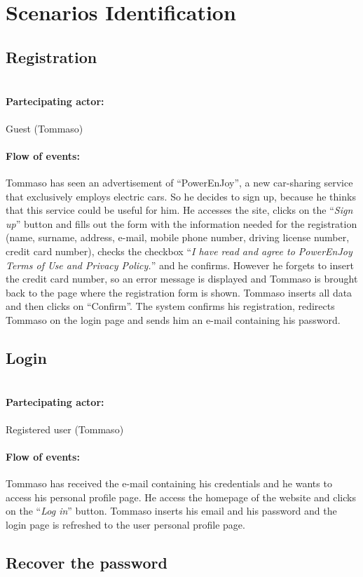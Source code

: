 \pagebreak
\section{Scenarios Identification}

\newcommand{\Scen}[2]{
    \paragraph{\\ Partecipating actor:} #1 
    \paragraph{Flow of events:} #2
}


\subsection{Registration}
 
\Scen{Guest (Tommaso)}{
	Tommaso has seen an advertisement of ``PowerEnJoy'', a new car-sharing service that exclusively employs electric cars. So he decides to sign up, because he thinks that this service could be useful for him.
    He accesses the site, clicks on the ``\textit{Sign up}'' button and fills out the form with the information needed for the registration (name, surname, address, e-mail, mobile phone number, driving license number, credit card number), checks the checkbox ``\textit{I have read and agree to PowerEnJoy Terms of Use and Privacy Policy.}'' and he confirms.
    However he forgets to insert the credit card number, so an error message is displayed and Tommaso is brought back to the page where the registration form is shown. Tommaso inserts all data and then clicks on ``Confirm''.
    The system confirms his registration, redirects Tommaso on the login page and sends him an e-mail containing his password.
}


\subsection{Login}

\Scen{Registered user (Tommaso)}{
	Tommaso has received the e-mail containing his credentials and he wants to access his personal profile page.
	He access the homepage of the website and clicks on the ``\textit{Log in}'' button. 
	Tommaso inserts his email and his password and the login page is refreshed to the user personal profile page.
}

\subsection{Recover the password}

